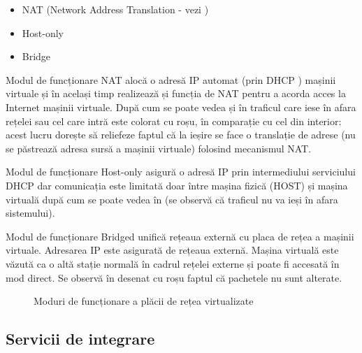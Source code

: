 \begin{itemize}
	\item NAT  (Network Address
		Translation - vezi )
	\item Host-only
	\item Bridge
\end{itemize}

Modul de funcționare NAT alocă o adresă IP automat (prin DHCP
) mașinii virtuale și în
același timp realizează și funcția de NAT pentru a acorda acces la Internet
mașinii virtuale. După cum se poate vedea și în
 traficul care iese în afara rețelei sau cel
care intră este colorat cu roșu, în comparație cu cel din interior: acest lucru
dorește să reliefeze faptul că la ieșire se face o translație de adrese (nu se
păstrează adresa sursă a mașinii virtuale) folosind mecanismul NAT.

Modul de funcționare Host-only asigură o adresă IP prin intermediului
serviciului DHCP dar comunicația este limitată doar între mașina fizică (HOST)
și mașina virtuală după cum se poate vedea în 
(se observă că traficul nu va ieși în afara sistemului).

Modul de funcționare Bridged unifică rețeaua externă cu placa de rețea a mașinii
virtuale. Adresarea IP este asigurată de rețeaua externă. Mașina virtuală este
văzută ca o altă stație normală în cadrul rețelei externe și poate fi accesată
în mod direct. Se observă în  desenat cu roșu
faptul că pachetele nu sunt alterate.

\begin{figure}[htbp]
	\centering
	\def\svgwidth{\columnwidth}
	
	\caption{Moduri de funcționare a plăcii de rețea virtualizate}
	\label{fig:vm-net}
\end{figure}

\subsection{Servicii de integrare}
\label{sec:vm-ops-services}

